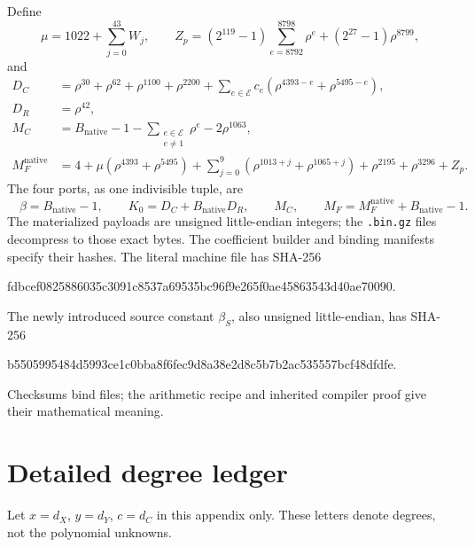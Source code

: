 \documentclass[11pt]{article}
\newcommand{\file}[1]{\nolinkurl{#1}}
\theoremstyle{definition}
\theoremstyle{remark}
\numberwithin{equation}{section}
\begin{document}
Define
\[
 \mu=1022+\sum_{j=0}^{43}W_j,\qquad
 Z_p=(2^{119}-1)\sum_{e=8792}^{8798}\rho^e
                       +(2^{27}-1)\rho^{8799},
\]
and
\begin{align*}
 D_C&=\rho^{30}+\rho^{62}+\rho^{1100}+\rho^{2200}
       +\sum_{e\in\mathcal E}c_e
                    (\rho^{4393-e}+\rho^{5495-e}),\\
 D_R&=\rho^{42},\\
 M_C&=B_{\mathrm{native}}-1
       -\sum_{\substack{e\in\mathcal E\\e\ne1}}\rho^e
       -2\rho^{1063},\\
 M_F^{\mathrm{native}}
    &=4+\mu(\rho^{4393}+\rho^{5495})
       +\sum_{j=0}^{9}(\rho^{1013+j}+\rho^{1065+j})
       +\rho^{2195}+\rho^{3296}+Z_p.
\end{align*}
The four ports, as one indivisible tuple, are
\[
 \boxed{\quad
 \beta=B_{\mathrm{native}}-1,\qquad
 K_0=D_C+B_{\mathrm{native}}D_R,\qquad
 M_C,\qquad
 M_F=M_F^{\mathrm{native}}+B_{\mathrm{native}}-1.
 \quad}
\]
The materialized payloads are unsigned little-endian integers;
the \file{.bin.gz} files decompress to those exact bytes.
The coefficient builder and binding manifests specify their hashes.
The literal machine file has SHA-256
\begin{center}\small\ttfamily
fdbcef0825886035c3091c8537a69535bc96f9e265f0ae45863543d40ae70090.
\end{center}
The newly introduced source constant \(\beta_S\), also unsigned
little-endian, has SHA-256
\begin{center}\small\ttfamily
b5505995484d5993ce1c0bba8f6fec9d8a38e2d8c5b7b2ac535557bcf48dfdfe.
\end{center}
Checksums bind files; the arithmetic recipe and inherited compiler proof
give their mathematical meaning.

\section{Detailed degree ledger}
\label{app:degree}

Let \(x=d_X\), \(y=d_Y\), \(c=d_C\) in this appendix only. These letters
denote degrees, not the polynomial unknowns.
\end{document}
